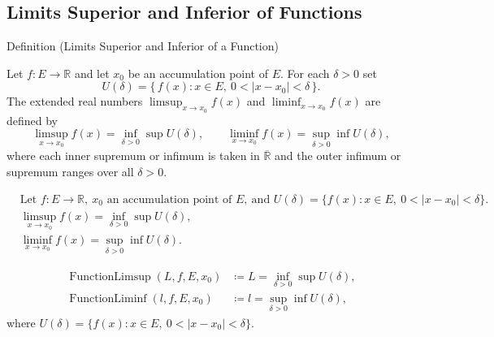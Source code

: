 
\subsection*{Limits Superior and Inferior of Functions}
\label{sec:limsup-liminf-functions}
\begin{definitionbox}{Definition (Limits Superior and Inferior of a Function)}
\begin{definition}
\label{def:limsup-liminf-function}
Let $f:E\to\mathbb{R}$ and let $x_0$ be an accumulation point of $E$. For each $\delta>0$ set
\[
U(\delta)=\{\,f(x): x\in E,\ 0<|x-x_0|<\delta\,\}.
\]
The extended real numbers $\limsup_{x\to x_0} f(x)$ and $\liminf_{x\to x_0} f(x)$ are defined by
\[
\limsup_{x\to x_0} f(x)=\inf_{\delta>0}\sup U(\delta),
\qquad
\liminf_{x\to x_0} f(x)=\sup_{\delta>0}\inf U(\delta),
\]
where each inner supremum or infimum is taken in $\overline{\mathbb{R}}$ and the outer infimum or supremum ranges over all $\delta>0$.
\end{definition}
\end{definitionbox}

\begin{remark*}
\[
\begin{aligned}
&\text{Let } f:E\to\mathbb{R},\ x_0 \text{ an accumulation point of } E,\ \text{and } U(\delta)=\{f(x):x\in E,\ 0<|x-x_0|<\delta\}.\\
&\limsup_{x\to x_0} f(x)=\inf_{\delta>0}\sup U(\delta),\\
&\liminf_{x\to x_0} f(x)=\sup_{\delta>0}\inf U(\delta).
\end{aligned}
\]
\end{remark*}

\begin{remark*}
\[
\begin{aligned}
\operatorname{FunctionLimsup}(L,f,E,x_0) &\coloneqq L=\inf_{\delta>0}\sup U(\delta),\\
\operatorname{FunctionLiminf}(l,f,E,x_0) &\coloneqq l=\sup_{\delta>0}\inf U(\delta),
\end{aligned}
\]
where $U(\delta)=\{f(x):x\in E,\ 0<|x-x_0|<\delta\}$.
\end{remark*}

